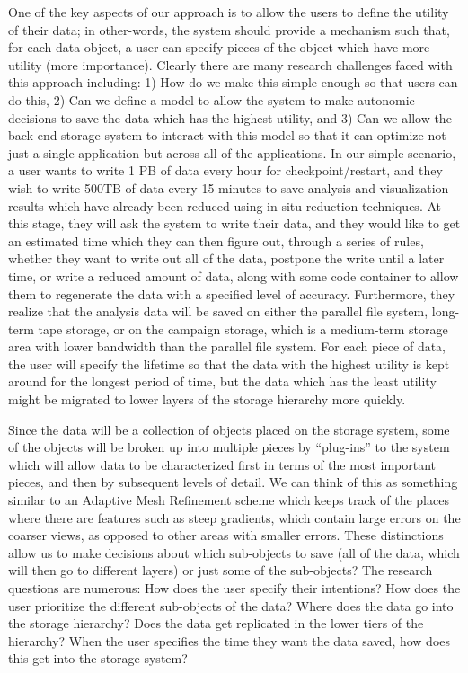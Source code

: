 One of the key aspects of our approach is to allow the users to define the
utility of their data; in other-words, the system should provide a
mechanism such that, for each data object, a user can specify pieces of the object
which have more utility (more importance).
Clearly there are many research challenges faced with
this approach including: 1) How do we make this simple enough so that users can
do this, 2) Can we define a model to allow the system to make
autonomic decisions to save the data which has the highest utility, and 3) Can
we allow the back-end storage system to interact with this model so that
it can optimize not just a single application but across all of the
applications.
  In our simple scenario, a user wants to write 1 PB of data every hour
for checkpoint/restart, and they wish to write 500TB of data every 15
minutes to save analysis and visualization results which have already been reduced
using in situ reduction techniques. At this stage, they will ask the system to
write their data, and they would like to get an estimated time which they can
then figure out, through a series of rules, whether they want to write out all
of the data, postpone the write until a later time, or write a reduced amount
of data, along with some code
container to allow them to regenerate the data with a specified level of
accuracy.  Furthermore, they realize that the analysis data will be saved on
either the parallel file system, long-term tape storage, or on the campaign storage,
which is a medium-term storage
area with lower bandwidth than the parallel file system.
For each piece of data, the user will specify the lifetime so
that the data with the highest utility is kept around for the longest
period of time, but the data which has the least utility might be migrated to
lower layers of the storage hierarchy more quickly. 

Since the data will be a collection of objects placed on the storage system,
some of the objects will be broken up into multiple pieces by ``plug-ins''
to the system which will allow data to be characterized first in terms of the most
important pieces, and then by subsequent levels of detail. We can think of this as
something similar to an Adaptive Mesh Refinement scheme which keeps track of
the places where there are features such as steep gradients, which contain large errors on the
coarser views, as opposed to other areas with smaller errors. These distinctions allow us to make decisions
about which sub-objects to save (all of the data, which will then go to
different layers) or just some of the sub-objects? The research questions
are numerous: How does the user specify their intentions? How does the user
prioritize the different sub-objects of the data? Where does the data go
into the storage hierarchy? Does the data get replicated in the lower tiers
of the hierarchy? When the user specifies the time they want the data saved,
how does this get into the storage system?

